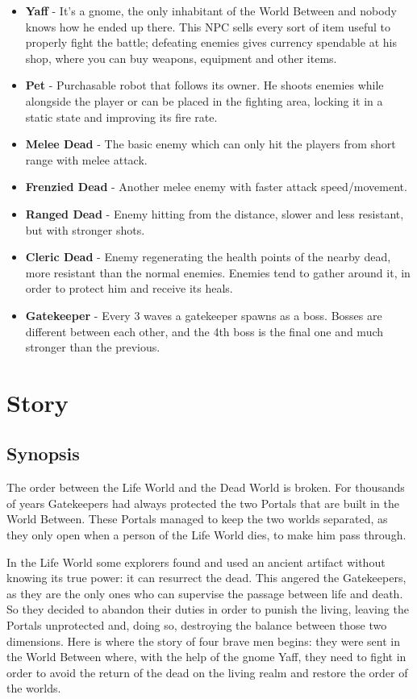 \documentclass[12pt]{article}
\begin{document}
\begin{itemize}
	\item \textbf{Yaff} - It’s a gnome, the only inhabitant of the World Between and nobody knows how he ended up there. This NPC sells every sort of item useful to properly fight the battle; defeating enemies gives currency spendable at his shop, where you can buy weapons, equipment and other items.
	\item \textbf{Pet} - Purchasable robot that follows its owner. He shoots enemies while alongside the player or can be placed in the fighting area, locking it in a static state and improving its fire rate.
	\item \textbf{Melee Dead} - The basic enemy which can only hit the players from short range with melee attack.
	\item \textbf{Frenzied Dead} - Another melee enemy with faster attack speed/movement.
	\item \textbf{Ranged Dead} - Enemy hitting from the distance, slower and less resistant, but with stronger shots.
	\item \textbf{Cleric Dead} - Enemy regenerating the health points of the nearby dead, more resistant than the normal enemies. Enemies tend to gather around it, in order to protect him and receive its heals.
	\item \textbf{Gatekeeper} - Every 3 waves a gatekeeper spawns as a boss. Bosses are different between each other, and the 4th boss is the final one and much stronger than the previous.
\end{itemize}

\newpage

\section{Story}

\subsection{Synopsis}

The order between the Life World and the Dead World is broken. For thousands of years Gatekeepers had always protected the two Portals that are built in the World Between. These Portals managed to keep the two worlds separated, as they only open when a person of the Life World dies, to make him pass through.

In the Life World some explorers found and used an ancient artifact without knowing its true power: it can resurrect the dead. This angered the Gatekeepers, as they are the only ones who can supervise the passage between life and death. So they decided to abandon their duties in order to punish the living, leaving the Portals unprotected and, doing so, destroying the balance between those two dimensions. Here is where the story of four brave men begins: they were sent in the World Between where, with the help of the gnome Yaff, they need to fight in order to avoid the return of the dead on the living realm and restore the order of the worlds. 
\end{document}
